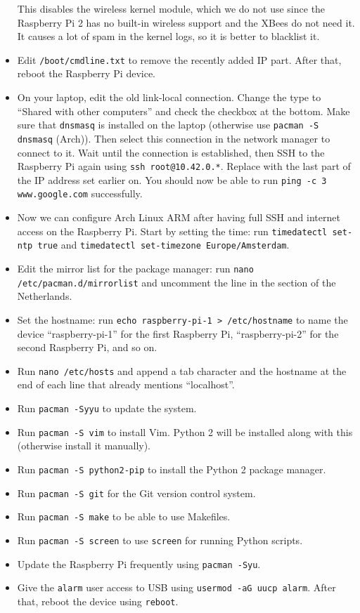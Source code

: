 \documentclass{article}
\newcommand{\arch}{{\color{red} (Arch)}}
\begin{document}
\begin{itemize}
          This disables the wireless kernel module, which we do not use since 
          the Raspberry Pi 2 has no built-in wireless support and the XBees do 
          not need it. It causes a lot of spam in the kernel logs, so it is 
          better to blacklist it.
    \item Edit {\tt /boot/cmdline.txt} to remove the recently added IP part.
          After that, reboot the Raspberry Pi device.
    \item On your laptop, edit the old link-local connection. Change the type 
          to ``Shared with other computers'' and check the checkbox at the 
          bottom. Make sure that {\tt dnsmasq} is installed on the laptop 
          (otherwise use {\tt pacman -S dnsmasq} \arch{}). Then select this 
          connection in the network manager to connect to it. Wait until the 
          connection is established, then SSH to the Raspberry Pi again using 
          {\tt ssh root@10.42.0.*}. Replace {\tt *} with the last part of the 
          IP address set earlier on. You should now be able to run {\tt ping -c 
          3 www.google.com} successfully.
    \item Now we can configure Arch Linux ARM after having full SSH and 
          internet access on the Raspberry Pi. Start by setting the time: run 
          {\tt timedatectl set-ntp true} and {\tt timedatectl set-timezone 
          Europe/Amsterdam}.
    \item Edit the mirror list for the package manager: run {\tt nano 
          /etc/pacman.d/mirrorlist} and uncomment the line in the section of 
          the Netherlands.
    \item Set the hostname: run {\tt echo raspberry-pi-1 > /etc/hostname} to 
          name the device ``raspberry-pi-1'' for the first Raspberry Pi, 
          ``raspberry-pi-2'' for the second Raspberry Pi, and so on.
    \item Run {\tt nano /etc/hosts} and append a tab character and the hostname 
          at the end of each line that already mentions ``localhost''.
    \item Run {\tt pacman -Syyu} to update the system.
    \item Run {\tt pacman -S vim} to install Vim. Python 2 will be installed 
          along with this (otherwise install it manually).
    \item Run {\tt pacman -S python2-pip} to install the Python 2 package 
          manager.
    \item Run {\tt pacman -S git} for the Git version control system.
    \item Run {\tt pacman -S make} to be able to use Makefiles.
    \item Run {\tt pacman -S screen} to use {\tt screen} for running Python
          scripts.
    \item Update the Raspberry Pi frequently using {\tt pacman -Syu}.
    \item Give the {\tt alarm} user access to USB using
          {\tt usermod -aG uucp alarm}. After that, reboot the device using
          {\tt reboot}.
\end{itemize}
\end{document}
